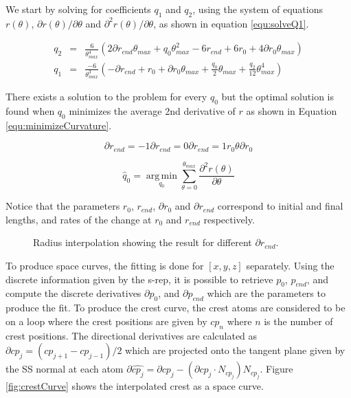 We start by solving for coefficients $q_1$ and $q_2$,
using the system of equations $r(\theta)$, $\partial r(\theta)/\partial \theta$ and $\partial^2 r(\theta)/\partial \theta$, 
as shown in equation \ref{equ:solveQ1}.

\begin{eqnarray} 
q_2 &=& \frac{6}{\theta_{max}^4} (2 \partial r_{end} \theta_{max} + q_0 \theta_{max}^2 - 6 r_{end} + 6 r_0 + 4 \partial r_0 \theta_{max}) \\
q_1 &=& \frac{-6}{\theta_{max}^3} (-\partial r_{end} + r_0 + \partial r_0 \theta_{max} +  \frac{q_0}{2} \theta_{max} + \frac{q_2}{12} \theta_{max}^4)
\label{equ:solveQ1}
\end{eqnarray} 

There exists a solution to the problem for every $q_0$ but
the optimal solution is found when $q_0$ minimizes the average 2nd derivative
of $r$ as shown in Equation \ref{equ:minimizeCurvature}.

\begin{equation}
 \partial r_{end} =  -1 \partial r_{end} = 0 \partial r_{end} = 1 r_0 \theta \partial r_0
\end{equation}


\begin{equation}  
  \hat q_0 = \operatorname*{arg\,min}_{q_0} \sum_{\theta = 0}^{\theta_{max}} \frac{\partial^2 r(\theta)}{\partial \theta}
  \label{equ:minimizeCurvature}
\end{equation}

Notice that the parameters $r_0$, $r_{end}$, $\partial r_0$ and $\partial r_{end}$ correspond to 
initial and final lengths, and rates of the change at $r_0$ and $r_{end}$ respectively.

\begin{figure} 
 \centering  
 \caption[Radius interpolation.]{Radius interpolation showing the result for different $\partial r_{end}$.}
 \label{fig:interpolateRadius}  
\end{figure}

To produce space curves, the fitting is done for $[x, y, z]$ separately.
Using the discrete information given by the s-rep,
it is possible to retrieve $p_0$, $p_{end}$, and compute the discrete derivatives $\partial p_0$, and $\partial p_{end}$ 
which are the parameters to produce the fit.
To produce the crest curve, the crest atoms are considered to be on a loop 
where the crest positions are given by $cp_n$ where $n$ is the number of crest positions.
The directional derivatives are calculated as $\partial cp_j = (cp_{j + 1} - cp_{j - 1})/2$
which are projected onto the tangent plane given by the SS normal at each atom
$\partial \hat {cp_j} = \partial cp_j - (\partial cp_j \cdot N_{cp_j})N_{cp_j}$.
Figure \ref{fig:crestCurve} shows the interpolated crest as a space curve.


